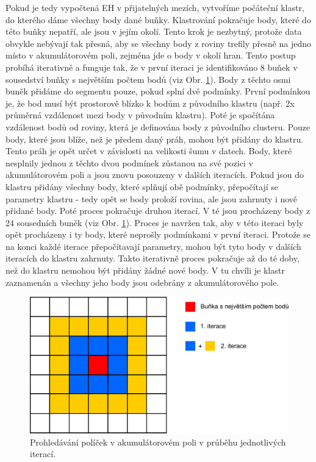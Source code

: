 \documentclass[11pt,twoside,a4paper]{book}
\begin{document}
Pokud je tedy vypočtená EH v přijatelných mezích, vytvoříme počáteční klastr, do kterého dáme všechny body dané buňky. Klastrování pokračuje body, které do této buňky nepatří, ale jsou v jejím okolí. Tento krok je nezbytný, protože data obvykle nebývají tak přesná, aby se všechny body z roviny trefily přesně na jedno místo v akumulátorovém poli, zejména jde o body v okolí hran. Tento postup probíhá iterativně a funguje tak, že v první iteraci je identifikováno 8 buňek v sousedství buňky s největším počtem bodů (viz Obr. \ref{fig:acc-pole-clus}).  Body z těchto osmi buněk přidáme do segmentu pouze, pokud splní dvě podmínky. První podmínkou je, že bod musí být prostorově blízko k bodům z původního klastru (např. 2x průměrná vzdálenost mezi body v původním klastru). Poté je spočítána vzdálenost bodů od roviny, která je definována body z původního clusteru. Pouze body, které jsou blíže, než je předem daný práh, mohou být přidány do klastru. Tento práh je opět určet v závislosti na velikosti šumu v datech.  Body, které nesplnily jednou z těchto dvou podmínek zůstanou na své pozici v akumulátorovém poli a jsou znovu posouzeny v dalších iteracích. Pokud jsou do klastru přidány všechny body, které splňují obě podmínky, přepočítají se parametry klastru - tedy opět se body proloží rovina, ale jsou zahrnuty i nově přidané body. Poté proces pokračuje druhou iterací. V té jsou procházeny body z 24 sousedních buněk (viz Obr. \ref{fig:acc-pole-clus}). Proces je navržen tak, aby v této iteraci byly opět procházeny i ty body, které neprošly podmínkami v první iteraci. Protože se na konci každé iterace přepočítavají parametry, mohou být tyto body v dalších iteracích do klastru zahrnuty. Takto iterativně proces pokračuje až do té doby, než do klastru nemohou být přidány žádné nové body. V tu chvíli je klastr zaznamenán a všechny jeho body jsou odebrány z akumulátorového pole.

\begin{figure}[ht]
\begin{center}
\includegraphics[width=12cm]{figures/acc-pole-clustering}
\caption{Prohledávání políček v akumulátorovém poli v průběhu jednotlivých iterací.}
\label{fig:acc-pole-clus}
\end{center}
\end{figure}
\end{document}
